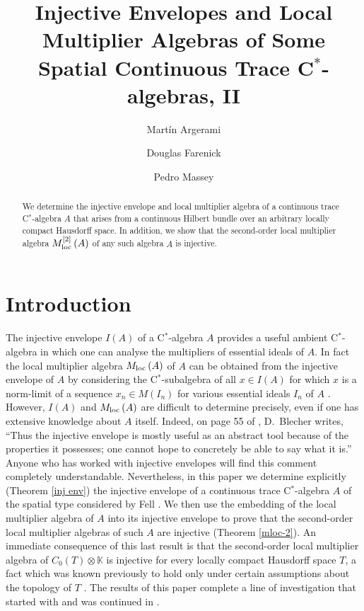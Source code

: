 \documentclass{amsart}
\title[Injective Envelopes and Local Multiplier Algebras, II]{Injective Envelopes and Local Multiplier Algebras of Some Spatial Continuous Trace C$^*$-algebras, II}
\author{Mart\'in Argerami}
\author{Douglas Farenick}
\author{Pedro Massey}
\theoremstyle{definition}
\theoremstyle{remark}
\begin{document}
\begin{abstract}
We determine the injective envelope and local multiplier algebra of a continuous trace
C$^*$-algebra $A$ that arises from a continuous Hilbert bundle over an arbitrary locally
compact Hausdorff space. In addition, we show that the second-order local multiplier
algebra ${M_{\rm loc}^{[2]}\,}(A)$ of any such algebra $A$ is injective.
\end{abstract}
\maketitle
\section*{Introduction}
The injective envelope $I(A)$ of a C$^*$-algebra $A$ \cite{hamana1979a} provides a useful
ambient C$^*$-algebra in which one can analyse the multipliers of essential
ideals of $A$. In fact the local multiplier algebra ${M_{\rm loc}\,}(A)$ of $A$
\cite{Ara--Mathieu-book} can be obtained from the injective envelope of $A$ by
considering the C$^*$-subalgebra of all $x\in I(A)$ for which $x$ is a norm-limit of a
sequence $x_n\in M(I_n)$ for various essential ideals $I_n$ of $A$
\cite{frank--paulsen2003}. However, $I(A)$ and ${M_{\rm loc}\,}(A)$ are difficult to determine
precisely, even if one has extensive knowledge about $A$ itself. Indeed, on page 55 of \cite{blecher2007},
D.~Blecher writes, ``Thus the injective envelope is
mostly useful as an abstract tool because of the properties it possesses; one cannot hope
to concretely be able to say what it is.'' Anyone who has worked with injective envelopes
will find this comment completely understandable. Nevertheless, in this paper we
determine explicitly (Theorem \ref{inj env}) the injective envelope of a continuous trace C$^*$-algebra $A$ 
of the spatial type considered by Fell \cite{fell1961}.
We then use the embedding of the local multiplier algebra of
$A$ into its injective envelope to prove that the second-order local multiplier algebras
of such $A$ are injective (Theorem \ref{mloc-2}). An immediate consequence of this last result is
that the second-order local multiplier algebra of
$C_0(T)\otimes\mathbb K$ is injective for every locally compact Hausdorff space $T$, a fact which was known previously
to hold only under certain assumptions about the topology of $T$ \cite{ara-mathieu2010,somerset2000}.
The results of this paper complete 
a line of investigation
that started with \cite{argerami--farenick--massey2009} and was continued in \cite{argerami--farenick--massey2010}. 
\end{document}
